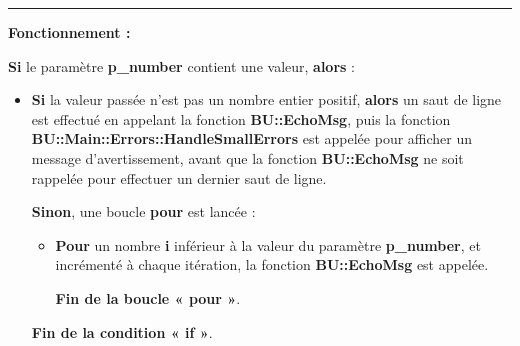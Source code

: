 \documentclass[a4paper,10pt]{article}
\begin{document}

\par\noindent\rule{\textwidth}{0.4pt}

\begin{justify}
    \textbf{Fonctionnement :}

    \textbf{\color{cond}Si} le paramètre \textbf{\color{vars}p\_number} contient une valeur, \textbf{\color{cond}alors} :

    \begin{itemize}
        \item
        {
            \begin{justify}
                \textbf{\color{cond}Si} la valeur passée n'est pas un nombre entier positif, \textbf{\color{cond}alors} un saut de ligne est effectué en appelant la fonction \textbf{\color{func}BU::EchoMsg}, puis la fonction \textbf{\color{func}BU::Main::Errors::HandleSmallErrors} est appelée pour afficher un message d'avertissement, avant que la fonction \textbf{\color{func}BU::EchoMsg} ne soit rappelée pour effectuer un dernier saut de ligne.
            \end{justify}

            \setlength{\parskip}{1em}

            \begin{justify}
                \textbf{\color{cond}Sinon}, une boucle \textbf{\color{loop}pour} est lancée :

                \begin{itemize}
                    \item
                    {
                        \begin{justify}
                            \textbf{\color{loop}Pour} un nombre \textbf{\color{vars}i} inférieur à la valeur du paramètre \textbf{\color{vars}p\_number}, et incrémenté à chaque itération, la fonction \textbf{\color{func}BU::EchoMsg} est appelée.
                        \end{justify}

                        \setlength{\parskip}{1em}

                        \begin{justify}
                            \textbf{\color{loop}Fin de la boucle « pour »}.
                        \end{justify}
                    }
                \end{itemize}
            \end{justify}

            \begin{justify}
                \textbf{\color{cond}Fin de la condition « if »}.
            \end{justify}
        }
    \end{itemize}
\end{justify}
\end{document}

